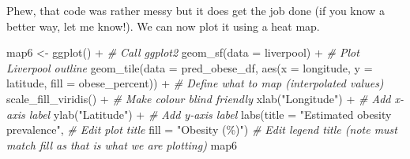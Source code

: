 \documentclass[
]{book}
\newenvironment{Shaded}{\begin{snugshade}}{\end{snugshade}}
\newcommand{\AttributeTok}[1]{\textcolor[rgb]{0.77,0.63,0.00}{#1}}
\newcommand{\CommentTok}[1]{\textcolor[rgb]{0.56,0.35,0.01}{\textit{#1}}}
\newcommand{\ConstantTok}[1]{\textcolor[rgb]{0.00,0.00,0.00}{#1}}
\newcommand{\FunctionTok}[1]{\textcolor[rgb]{0.00,0.00,0.00}{#1}}
\newcommand{\NormalTok}[1]{#1}
\newcommand{\OtherTok}[1]{\textcolor[rgb]{0.56,0.35,0.01}{#1}}
\newcommand{\SpecialCharTok}[1]{\textcolor[rgb]{0.00,0.00,0.00}{#1}}
\newcommand{\StringTok}[1]{\textcolor[rgb]{0.31,0.60,0.02}{#1}}
\begin{document}
\begin{Shaded}
\end{Shaded}

Phew, that code was rather messy but it does get the job done (if you know a better way, let me know!). We can now plot it using a heat map.

\begin{Shaded}
\begin{Highlighting}[]
\NormalTok{map6 }\OtherTok{\textless{}{-}} \FunctionTok{ggplot}\NormalTok{() }\SpecialCharTok{+} \CommentTok{\# Call ggplot2}
  \FunctionTok{geom\_sf}\NormalTok{(}\AttributeTok{data =}\NormalTok{ liverpool) }\SpecialCharTok{+} \CommentTok{\# Plot Liverpool outline}
  \FunctionTok{geom\_tile}\NormalTok{(}\AttributeTok{data =}\NormalTok{ pred\_obese\_df, }\FunctionTok{aes}\NormalTok{(}\AttributeTok{x =}\NormalTok{ longitude, }\AttributeTok{y =}\NormalTok{ latitude, }\AttributeTok{fill =}\NormalTok{ obese\_percent)) }\SpecialCharTok{+} \CommentTok{\# Define what to map (interpolated values)}
  \FunctionTok{scale\_fill\_viridis}\NormalTok{() }\SpecialCharTok{+} \CommentTok{\# Make colour blind friendly}
  \FunctionTok{xlab}\NormalTok{(}\StringTok{"Longitude"}\NormalTok{) }\SpecialCharTok{+} \CommentTok{\# Add x{-}axis label}
  \FunctionTok{ylab}\NormalTok{(}\StringTok{"Latitude"}\NormalTok{) }\SpecialCharTok{+} \CommentTok{\# Add y{-}axis label}
  \FunctionTok{labs}\NormalTok{(}\AttributeTok{title =} \StringTok{"Estimated obesity prevalence"}\NormalTok{, }\CommentTok{\# Edit plot title }
       \AttributeTok{fill =} \StringTok{"Obesity (\%)"}\NormalTok{) }\CommentTok{\# Edit legend title (note must match fill as that is what we are plotting)}
\NormalTok{map6}
\end{Highlighting}
\end{Shaded}
\end{document}
